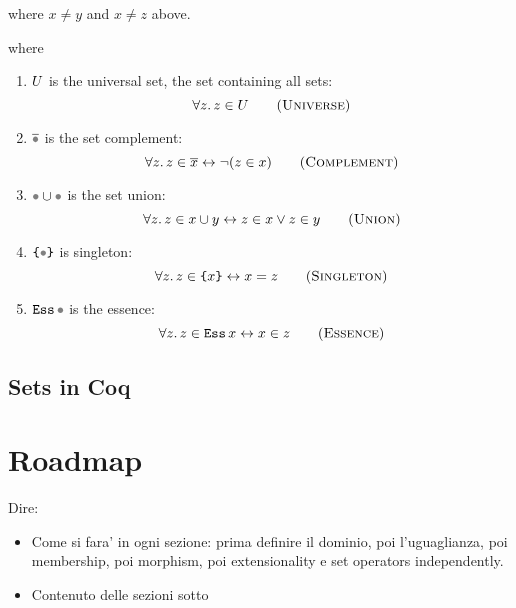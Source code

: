 \documentclass[sigplan,10pt,anonymous,review]{acmart}%
\begin{document}
where $x\neq y$ and $x \neq z$ above.

where
\begin{enumerate} \renewcommand\labelitemi{--}
  \item $U$ is the universal set, \ie{} the set containing all sets:
    \[ \forall z.\, z \in \Universe \sctag{Universe} \]
  \item $\Complement \Placeholder$ is the set complement:
    \[ \forall z.\, z \in \Complement x \leftrightarrow \neg (z \in x) \sctag{Complement}\]
  \item $\Union \Placeholder \Placeholder$ is the set union:
    \[ \forall z.\, z \in \Union x y \leftrightarrow z \in x \lor z \in y \sctag{Union} \]
  \item $\Sing\Placeholder$ is singleton:
    \[ \forall z.\, z \in \Sing x \leftrightarrow x = z \sctag{Singleton} \]
  \item $\Essence\Placeholder$ is the essence:
    \[ \forall z.\, z \in \Essence{x} \leftrightarrow x \in z \sctag{Essence} \]
\end{enumerate}

\subsection{Sets in Coq}


\section{Roadmap}
Dire:
\begin{itemize}
  \item Come si fara' in ogni sezione: prima definire il dominio, poi l'uguaglianza, poi membership, poi morphism, poi extensionality e set operators independently.
  \item Contenuto delle sezioni sotto
\end{itemize}

\section{\ZF}


\section{\NFTWO}

\end{document}
